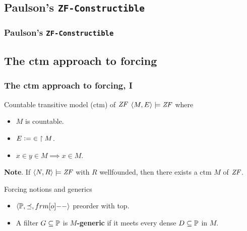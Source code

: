 \documentclass[english]{beamer}
\begin{document}
\subsection{Paulson's \texttt{ZF-Constructible}}

\begin{frame}
  \frametitle{Paulson's \texttt{ZF-Constructible}}

\end{frame}


\subsection{The ctm approach to forcing}

\begin{frame}
  \frametitle{The ctm approach to forcing, I}
  \begin{block}{Countable transitive model (ctm) of $\mathit{ZF}$}
    $\langle M, E\rangle \models \mathit{ZF}$ where
    \begin{itemize}
    \item $M$ is countable.
    \item $E \mathrel{\mathop:}= {\in}\restriction M$.
    \item $x\in y \in M \implies x\in M$.
    \end{itemize}
  \end{block}
  \pause%
  \textbf{Note}. If $\langle N, R\rangle \models \mathit{ZF}$ with $R$ wellfounded, then there
  exists a ctm $M$ of $\mathit{ZF}$.
  \pause
  \begin{block}{Forcing notions and generics}
    \begin{itemize}
    \item $\lb \PP, {\preceq} ,\1\rb$ preorder with top.
    \item A filter $G\subseteq \mathbb{P}$ is \textbf{$M$-generic} if it meets
      every dense $D\subseteq \mathbb{P}$ in $M$.
    \end{itemize}
  \end{block}
\end{frame}
\end{document}
